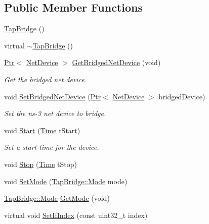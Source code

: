 \subsection*{Public Member Functions}
\begin{DoxyCompactItemize}
\item 
\hyperlink{classns3_1_1TapBridge_a59285065e82d8ba63306846fc4082f4b}{Tap\+Bridge} ()
\item 
virtual \hyperlink{classns3_1_1TapBridge_aa6f741dae2dda424601c96073422e992}{$\sim$\+Tap\+Bridge} ()
\item 
\hyperlink{classns3_1_1Ptr}{Ptr}$<$ \hyperlink{classns3_1_1NetDevice}{Net\+Device} $>$ \hyperlink{classns3_1_1TapBridge_afc497fe420a336be2ff9076ab90cf713}{Get\+Bridged\+Net\+Device} (void)
\begin{DoxyCompactList}\small\item\em Get the bridged net device. \end{DoxyCompactList}\item 
void \hyperlink{classns3_1_1TapBridge_a0889ae6308758421297e74cb4be9af5b}{Set\+Bridged\+Net\+Device} (\hyperlink{classns3_1_1Ptr}{Ptr}$<$ \hyperlink{classns3_1_1NetDevice}{Net\+Device} $>$ bridged\+Device)
\begin{DoxyCompactList}\small\item\em Set the ns-\/3 net device to bridge. \end{DoxyCompactList}\item 
void \hyperlink{classns3_1_1TapBridge_a729662b8454d1c8202add94ebf389bb9}{Start} (\hyperlink{classns3_1_1Time}{Time} t\+Start)
\begin{DoxyCompactList}\small\item\em Set a start time for the device. \end{DoxyCompactList}\item 
void \hyperlink{classns3_1_1TapBridge_ab94057d00c75768838fe783eaff278e3}{Stop} (\hyperlink{classns3_1_1Time}{Time} t\+Stop)
\item 
void \hyperlink{classns3_1_1TapBridge_a435d654af7e7970c365d14b4a5dc3044}{Set\+Mode} (\hyperlink{classns3_1_1TapBridge_acac8d3ebe259ddfa9cd369515f04618d}{Tap\+Bridge\+::\+Mode} mode)
\item 
\hyperlink{classns3_1_1TapBridge_acac8d3ebe259ddfa9cd369515f04618d}{Tap\+Bridge\+::\+Mode} \hyperlink{classns3_1_1TapBridge_a0d4f1ff39b0d57d463a16f1617e6d19f}{Get\+Mode} (void)
\item 
virtual void \hyperlink{classns3_1_1TapBridge_aab34bfe78791ad5401d23e21b7cff850}{Set\+If\+Index} (const uint32\+\_\+t index)

\end{DoxyCompactItemize}
